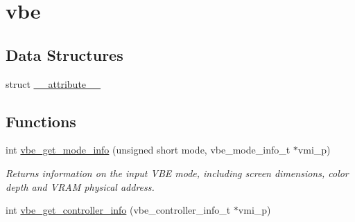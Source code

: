 \hypertarget{group__vbe}{}\section{vbe}
\label{group__vbe}
\subsection*{Data Structures}
\begin{DoxyCompactItemize}
\item 
struct \hyperlink{struct____attribute____}{\+\_\+\+\_\+attribute\+\_\+\+\_\+}
\end{DoxyCompactItemize}
\subsection*{Functions}
\begin{DoxyCompactItemize}
\item 
int \hyperlink{group__vbe_ga4ef3234e41f2050bc094a22049b69e45}{vbe\+\_\+get\+\_\+mode\+\_\+info} (unsigned short mode, vbe\+\_\+mode\+\_\+info\+\_\+t $\ast$vmi\+\_\+p)
\begin{DoxyCompactList}\small\item\em Returns information on the input V\+BE mode, including screen dimensions, color depth and V\+R\+AM physical address. \end{DoxyCompactList}\item 
int \hyperlink{group__vbe_ga18c7989ffdce07149a4f948798afeca5}{vbe\+\_\+get\+\_\+controller\+\_\+info} (vbe\+\_\+controller\+\_\+info\+\_\+t $\ast$vmi\+\_\+p)
\end{DoxyCompactItemize}
